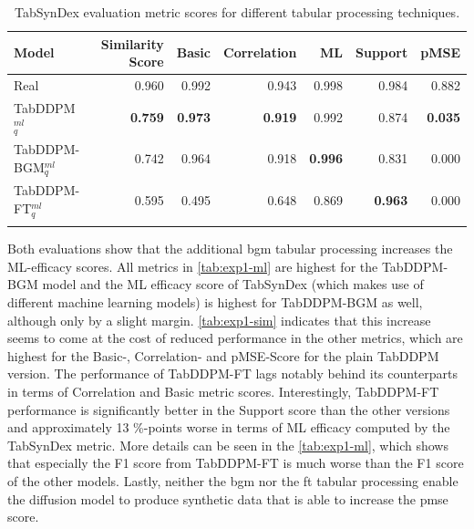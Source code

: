 \begin{table}[h]
	\centering
	\begin{tabular}{lrrrrrr}
		\toprule
		\textbf{Model}         & \textbf{Similarity Score} & \textbf{Basic} & \textbf{Correlation} & \textbf{ML}    & \textbf{Support} & \textbf{pMSE}  \\
		\midrule
		Real                   & 0.960                     & 0.992          & 0.943                & 0.998          & 0.984            & 0.882          \\
		TabDDPM$^{ml}_{q}$     & \textbf{0.759}            & \textbf{0.973} & \textbf{0.919}       & 0.992          & 0.874            & \textbf{0.035} \\
		TabDDPM-BGM$^{ml}_{q}$ & 0.742                     & 0.964          & 0.918                & \textbf{0.996} & 0.831            & 0.000          \\
		TabDDPM-FT$^{ml}_{q}$  & 0.595                     & 0.495          & 0.648                & 0.869          & \textbf{0.963}   & 0.000          \\
		\bottomrule
		\multicolumn{7}{c}{}\\[-0.6em]
	\end{tabular}
	\caption[Experiment 1 TabSynDex]{TabSynDex evaluation metric scores for different tabular processing techniques.}
	\label{tab:exp1-sim}
\end{table}

Both evaluations show that the additional \gls{bgm} tabular processing increases the ML-efficacy scores.
All metrics in \autoref{tab:exp1-ml} are highest for the TabDDPM-BGM model and the ML efficacy score of TabSynDex (which makes use of different machine learning models)
is highest for TabDDPM-BGM as well, although only by a slight margin.
\autoref{tab:exp1-sim} indicates that this increase seems to come at the cost of reduced performance in the other metrics, which are highest for the Basic-, Correlation- and pMSE-Score for the plain TabDDPM version.
The performance of TabDDPM-FT lags notably behind its counterparts in terms of Correlation and Basic metric scores.
Interestingly, TabDDPM-FT performance is significantly better in the Support score than the other versions and approximately 13 \%-points worse in terms of ML efficacy computed by the TabSynDex metric.
More details can be seen in the \autoref{tab:exp1-ml}, which shows that especially the F1 score from TabDDPM-FT is much worse than the F1 score of the other models.
Lastly, neither the \gls{bgm} nor the \gls{ft} tabular processing enable the diffusion model to produce synthetic data that is able to increase the \gls{pmse} score.


